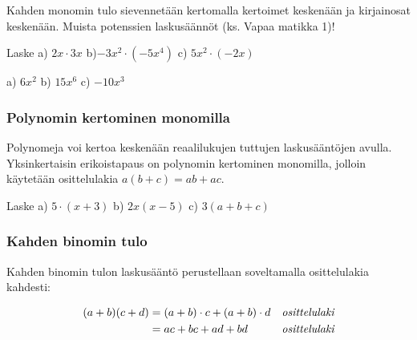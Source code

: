 Kahden monomin tulo sievennetään kertomalla kertoimet keskenään ja kirjainosat keskenään. Muista potenssien laskusäännöt (ks. Vapaa matikka 1)!

\begin{esimerkki}
    Laske \quad 
    a) $2x\cdot 3x$ \quad
    b)$-3x^2\cdot (-5x^4)$ \quad
    c) $5x^2 \cdot (-2x)$
    \begin{esimratk}
        \begin{alakohdat}
        \end{alakohdat}
    \end{esimratk}
    \begin{esimvast}
        a) $6x^2$ \quad
        b) $15x^6$ \quad
        c) $-10x^3$
    \end{esimvast}
\end{esimerkki}

\subsubsection*{Polynomin kertominen monomilla}

Polynomeja voi kertoa keskenään reaalilukujen tuttujen laskusääntöjen avulla. Yksinkertaisin erikoistapaus on polynomin kertominen monomilla, jolloin
käytetään osittelulakia $a(b+c)=ab+ac$.

\begin{esimerkki}
Laske \quad a) $5\cdot(x+3)$ \quad b) $2x(x-5)$ \quad 
c) $3(a+b+c)$
\begin{alakohdat}
\end{alakohdat}
\end{esimerkki} 

\subsubsection*{Kahden binomin tulo}

Kahden binomin tulon laskusääntö perustellaan soveltamalla osittelulakia kahdesti:

\begin{align*}
(a+b)(c+d) &= (a+b)\cdot c + (a+b)\cdot d &\emph{osittelulaki} \\
 &= ac+bc+ad+bd &\emph{osittelulaki} 
\end{align*}

